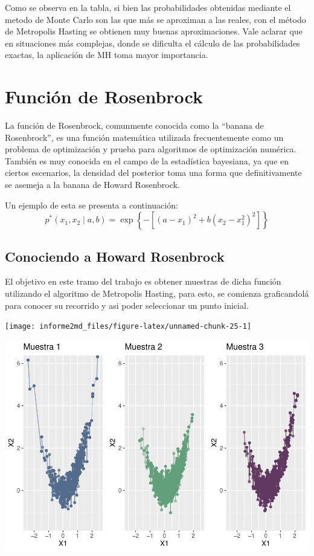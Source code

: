 \documentclass[
]{article}
\begin{document}
Como se observa en la tabla, si bien las probabilidades obtenidas
mediante el metodo de Monte Carlo son las que más se aproximan a las
reales, con el método de Metropolis Hasting se obtienen muy buenas
aproximaciones. Vale aclarar que en situaciones más complejas, donde se
dificulta el cálculo de las probabilidades exactas, la aplicación de MH
toma mayor importancia.

\newpage

\hypertarget{funciuxf3n-de-rosenbrock}{%
\section{Función de Rosenbrock}\label{funciuxf3n-de-rosenbrock}}

La función de Rosenbrock, comunmente conocida como la ``banana de
Rosenbrock'', es una función matemática utilizada frecuentemente como un
problema de optimización y prueba para algoritmos de optimización
numérica. También es muy conocida en el campo de la estadística
bayesiana, ya que en ciertos escenarios, la densidad del posterior toma
una forma que definitivamente se asemeja a la banana de Howard
Rosenbrock.

Un ejemplo de esta se presenta a continuación:
\[p^*(x_1, x_2 \mid a, b) = \exp \left\{-\left[(a - x_1) ^ 2 + b(x_2 - x_1^2) ^ 2\right] \right\}\]

\hypertarget{conociendo-a-howard-rosenbrock}{%
\subsection{Conociendo a Howard
Rosenbrock}\label{conociendo-a-howard-rosenbrock}}

El objetivo en este tramo del trabajo es obtener muestras de dicha
función utilizando el algoritmo de Metropolis Hasting, para esto, se
comienza graficandolá para conocer su recorrido y asi poder seleccionar
un punto inicial.

\begin{center}\texttt{[image: informe2md\_files/figure-latex/unnamed-chunk-25-1]} \end{center}

\begin{center}\includegraphics{informe2md_files/figure-latex/unnamed-chunk-26-1} \end{center}
\end{document}
